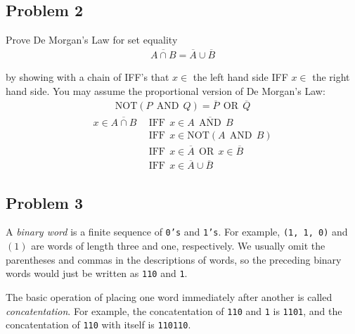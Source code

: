 \documentclass[12pt]{article}
\begin{document}
\subsection*{Problem 2}
\par{Prove De Morgan's Law for set equality}
\begin{align*}
\overline{A\cap B} = \overline{A}\cup\overline{B}
\end{align*}
\par{by showing with a chain of IFF's that $x \in$ the left hand side IFF $x \in$ the right hand side. You may assume the proportional version of De Morgan's Law:}
\begin{align*}
\text{NOT}(P\:\:\text{AND}\:\:Q) = \overline{P}\:\:\text{OR}\:\:\overline{Q}
\end{align*}
\begin{align*}
x \in \overline{A \cap B}\:\:&\text{IFF}\:\:x \in \overline{A\:\:\text{AND}\:\:B} \\
&\text{IFF}\:\: x \in \text{NOT}(A\:\:\text{AND}\:\:B) \\
&\text{IFF}\:\: x \in \overline{A}\:\:\text{OR}\:\:x \in \overline{B} \\
&\text{IFF}\:\: x \in \overline{A} \cup \overline{B}
\end{align*}
\subsection*{Problem 3}
\par{A \emph{binary word} is a finite sequence of \texttt{0's} and \texttt{1's}. For example, \texttt{(1, 1, 0)} and $(1)$ are words of length three and one, respectively. We usually omit the parentheses and commas in the descriptions of words, so the preceding binary words would just be written as \texttt{110} and \texttt{1}.}
\par{The basic operation of placing one word immediately after another is called \emph{concatentation}. For example, the concatentation of \texttt{110} and \texttt{1} is \texttt{1101}, and the concatentation of \texttt{110} with itself is \texttt{110110}.}
\end{document}
